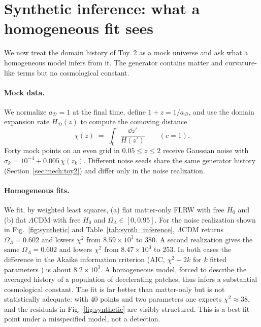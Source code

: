 \documentclass[11pt]{article}
\theoremstyle{plain}
\theoremstyle{definition}
\theoremstyle{remark}
\begin{document}
\section{Synthetic inference: what a homogeneous fit sees}\label{sec:synthetic}

We now treat the domain history of Toy~2 as a mock universe and ask what a homogeneous model infers from it. The generator contains matter and curvature-like terms but no cosmological constant.

\paragraph{Mock data.}
We normalize $a_{\mathcal D}=1$ at the final time, define $1+z=1/a_{\mathcal D}$, and use the domain expansion rate $H_{\mathcal D}(z)$ to compute the comoving distance
\begin{equation}
\chi(z) \;=\; \int_0^z\frac{\dd z'}{H(z')}\qquad(c=1).
\label{eq:chi_def}
\end{equation}
Forty mock points on an even grid in $0.05\le z\le2$ receive Gaussian noise with $\sigma_k=10^{-4}+0.005\,\chi(z_k)$. Different noise seeds share the same generator history (Section~\ref{sec:mech:toy2}) and differ only in the noise realization.

\paragraph{Homogeneous fits.}
We fit, by weighted least squares, (a) flat matter-only FLRW with free $H_0$ and (b) flat $\Lambda$CDM with free $H_0$ and $\Omega_\Lambda\in[0,0.95]$. For the noise realization shown in Fig.~\ref{fig:synthetic} and Table~\ref{tab:synth_inference}, $\Lambda$CDM returns $\Omega_\Lambda=0.602$ and lowers $\chi^2$ from $8.59\times10^{3}$ to $380$. A second realization gives the same $\Omega_\Lambda=0.602$ and lowers $\chi^2$ from $8.47\times10^{3}$ to $253$. In both cases the difference in the Akaike information criterion (AIC, $\chi^2+2k$ for $k$ fitted parameters \cite{Akaike1974AIC}) is about $8.2\times10^3$. A homogeneous model, forced to describe the averaged history of a population of decelerating patches, thus infers a substantial cosmological constant. The fit is far better than matter-only but is not statistically adequate: with 40 points and two parameters one expects $\chi^2\approx38$, and the residuals in Fig.~\ref{fig:synthetic} are visibly structured. This is a best-fit point under a misspecified model, not a detection.
\end{document}
